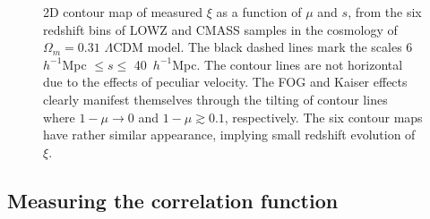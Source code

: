 \documentclass[iop]{emulateapj}
\begin{document}
\begin{figure}
   \caption{
    \label{fig_2pcfcon} 
    2D contour map of measured $\xi$ as a function of $\mu$ and $s$, from the six redshift bins of LOWZ and CMASS samples 
      in the cosmology of $\Omega_m=0.31$ $\Lambda$CDM model.
    The black dashed lines mark the scales 6\ $h^{-1}$Mpc $\leq s\leq$ 40\ $h^{-1}$Mpc.
    The contour lines are not horizontal due to the effects of peculiar velocity.
    The FOG and Kaiser effects clearly manifest themselves through the tilting of contour 
     lines where $1-\mu \rightarrow 0$ and $1-\mu \gtrsim0.1$, respectively.
    The six contour maps have rather similar appearance, implying small redshift evolution of $\xi$.
   }
\end{figure}

\subsection{Measuring the correlation function}
\end{document}
